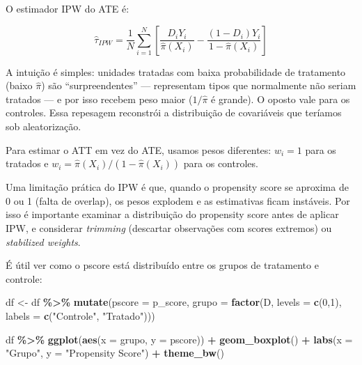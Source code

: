 \documentclass[
]{article}
\newenvironment{Shaded}{\begin{snugshade}}{\end{snugshade}}
\newcommand{\AttributeTok}[1]{\textcolor[rgb]{0.13,0.29,0.53}{#1}}
\newcommand{\DecValTok}[1]{\textcolor[rgb]{0.00,0.00,0.81}{#1}}
\newcommand{\FunctionTok}[1]{\textcolor[rgb]{0.13,0.29,0.53}{\textbf{#1}}}
\newcommand{\NormalTok}[1]{#1}
\newcommand{\OtherTok}[1]{\textcolor[rgb]{0.56,0.35,0.01}{#1}}
\newcommand{\SpecialCharTok}[1]{\textcolor[rgb]{0.81,0.36,0.00}{\textbf{#1}}}
\newcommand{\StringTok}[1]{\textcolor[rgb]{0.31,0.60,0.02}{#1}}
\begin{document}
O estimador IPW do ATE é:

\[\hat{\tau}_{IPW} = \frac{1}{N}\sum_{i=1}^{N} \left[\frac{D_i Y_i}{\hat{\pi}(X_i)} - \frac{(1-D_i) Y_i}{1-\hat{\pi}(X_i)}\right]\]

A intuição é simples: unidades tratadas com baixa probabilidade de tratamento (baixo \(\hat{\pi}\)) são ``surpreendentes'' --- representam tipos que normalmente não seriam tratados --- e por isso recebem peso maior (\(1/\hat{\pi}\) é grande). O oposto vale para os controles. Essa repesagem reconstrói a distribuição de covariáveis que teríamos sob aleatorização.

Para estimar o ATT em vez do ATE, usamos pesos diferentes: \(w_i = 1\) para os tratados e \(w_i = \hat{\pi}(X_i)/(1-\hat{\pi}(X_i))\) para os controles.

Uma limitação prática do IPW é que, quando o propensity score se aproxima de 0 ou 1 (falta de overlap), os pesos explodem e as estimativas ficam instáveis. Por isso é importante examinar a distribuição do propensity score antes de aplicar IPW, e considerar \emph{trimming} (descartar observações com scores extremos) ou \emph{stabilized weights}.

É útil ver como o pscore está distribuído entre os grupos de tratamento e controle:

\begin{Shaded}
\begin{Highlighting}[]
\NormalTok{df }\OtherTok{\textless{}{-}}\NormalTok{ df }\SpecialCharTok{\%\textgreater{}\%}
  \FunctionTok{mutate}\NormalTok{(}\AttributeTok{pscore =}\NormalTok{ p\_score,}
         \AttributeTok{grupo =} \FunctionTok{factor}\NormalTok{(D, }\AttributeTok{levels =} \FunctionTok{c}\NormalTok{(}\DecValTok{0}\NormalTok{,}\DecValTok{1}\NormalTok{),}
                        \AttributeTok{labels =} \FunctionTok{c}\NormalTok{(}\StringTok{"Controle"}\NormalTok{, }\StringTok{"Tratado"}\NormalTok{)))}

\NormalTok{df }\SpecialCharTok{\%\textgreater{}\%}
  \FunctionTok{ggplot}\NormalTok{(}\FunctionTok{aes}\NormalTok{(}\AttributeTok{x =}\NormalTok{ grupo, }\AttributeTok{y =}\NormalTok{ pscore)) }\SpecialCharTok{+} \FunctionTok{geom\_boxplot}\NormalTok{() }\SpecialCharTok{+}
  \FunctionTok{labs}\NormalTok{(}\AttributeTok{x =} \StringTok{"Grupo"}\NormalTok{, }\AttributeTok{y =} \StringTok{"Propensity Score"}\NormalTok{) }\SpecialCharTok{+} \FunctionTok{theme\_bw}\NormalTok{()}
\end{Highlighting}
\end{Shaded}
\end{document}
